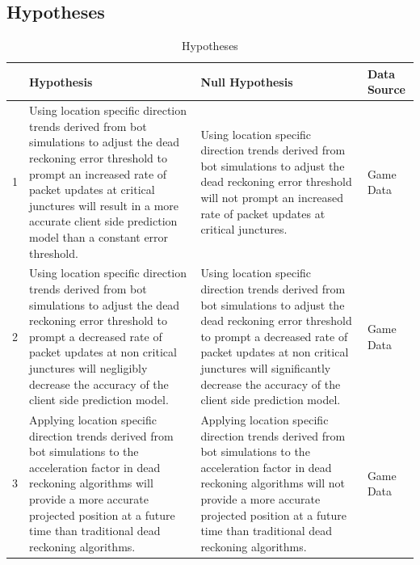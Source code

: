 \documentclass[journal]{IEEEtran}
\begin{document}
\subsection{Hypotheses} \label{hypothesis}

\begin{table}[h]
	\centering
	\caption{Hypotheses}
	\label{table:hypothesis}
	\def\arraystretch{1.5}
	\begin{tabular}{|c|p{7cm}|p{7cm}|p{1.75cm}|}
		\hline
		& \textbf{Hypothesis}& \textbf{Null Hypothesis} & \textbf{Data Source} \\ \hline
		1 & Using location specific direction trends derived from bot simulations to adjust the dead reckoning error threshold to prompt an increased rate of packet updates at critical junctures will result in a more accurate client side prediction model than a constant error threshold.
		& Using location specific direction trends derived from bot simulations to adjust the dead reckoning error threshold will not prompt an increased rate of packet updates at critical junctures.
		& Game Data \\ \hline
		2 & Using location specific direction trends derived from bot simulations to adjust the dead reckoning error threshold to prompt a decreased rate of packet updates at non critical junctures will negligibly decrease the accuracy of the client side prediction model.
		& Using location specific direction trends derived from bot simulations to adjust the dead reckoning error threshold to prompt a decreased rate of packet updates at non critical junctures will significantly decrease the accuracy of the client side prediction model.
		& Game Data \\ \hline
		3 & Applying location specific direction trends derived from bot simulations to the acceleration factor in dead reckoning algorithms will provide a more accurate projected position at a future time than traditional dead reckoning algorithms.
		& Applying location specific direction trends derived from bot simulations to the acceleration factor in dead reckoning algorithms will not provide a more accurate projected position at a future time than traditional dead reckoning algorithms.
		& Game Data \\ \hline
	\end{tabular}
\end{table}
\end{document}
